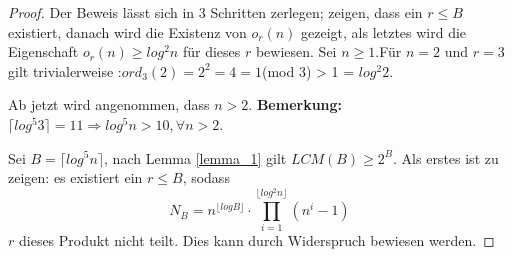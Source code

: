 \documentclass[12pt,oneside]{article}
\theoremstyle{remark}
\theoremstyle{definition}
\begin{document}
\begin{proof}
Der Beweis lässt sich in 3 Schritten zerlegen; zeigen, dass ein $r \leq B$ existiert, danach wird die Existenz von $o_{r}(n)$ gezeigt, als letztes wird die Eigenschaft $o_{r}(n) \geq log^2 n$ für dieses $r$ bewiesen. 
Sei $n \geq 1$.\newline\newline Für $n = 2$ und $r = 3$ gilt trivialerweise :\newline\newline $ord_{3}(2) = 2^2 = 4 = 1 $(mod 3) > 1 = $log^2 2$.

Ab jetzt wird angenommen, dass $n > 2$.\newline\newline
\textbf{Bemerkung: } $\lceil log^5 3 \rceil = 11 \Rightarrow log^5 n > 10, \forall n > 2$.\newline\newline

Sei $B = \lceil log^5 n \rceil$, nach Lemma \ref{lemma_1} gilt $LCM(B) \geq 2^B$. Als erstes ist zu zeigen: es existiert ein $r \leq B$, sodass
\begin{equation}\label{prod_cor}
     N_{B} = n^{\lfloor log B \rfloor } \cdot \prod_{i = 1}^{\lfloor log^2 n \rfloor} (n^i - 1)
\end{equation}
$r$ dieses Produkt nicht teilt. Dies kann durch Widerspruch bewiesen werden.


\end{proof}
\end{document}
